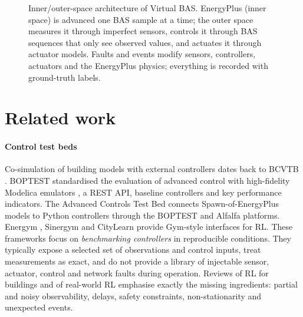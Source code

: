 \documentclass[preprint,12pt,authoryear=false]{elsarticle}
\begin{document}
\begin{figure}[t]
{}
\caption{Inner/outer-space architecture of Virtual BAS. EnergyPlus (inner space) is advanced one BAS sample at a time;
the outer space measures it through imperfect sensors, controls it through BAS sequences that only see observed
values, and actuates it through actuator models. Faults and events modify sensors, controllers, actuators and the
EnergyPlus physics; everything is recorded with ground-truth labels.}
\label{fig:architecture}
\end{figure}

\section{Related work}
\label{sec:related}

\paragraph{Control test beds} Co-simulation of building models with external controllers dates back to BCVTB
\cite{wetter2011bcvtb}. BOPTEST \cite{blum2021boptest} standardised the evaluation of advanced control with
high-fidelity Modelica emulators \cite{wetter2014modelica}, a REST API, baseline controllers and key performance
indicators. The Advanced Controls Test Bed \cite{marzullo2022actb} connects Spawn-of-EnergyPlus models to Python
controllers through the BOPTEST and Alfalfa platforms. Energym \cite{scharnhorst2021energym}, Sinergym
\cite{jimenez2021sinergym} and CityLearn \cite{vazquez2019citylearn} provide Gym-style interfaces \cite{brockman2016gym}
for RL. These frameworks focus on \emph{benchmarking controllers} in reproducible conditions. They typically expose a
selected set of observations and control inputs, treat measurements as exact, and do not provide a library of
injectable sensor, actuator, control and network faults during operation. Reviews of RL for buildings
\cite{wang2020rlreview} and of real-world RL \cite{nweye2022realworld,dulacarnold2021challenges} emphasise exactly the
missing ingredients: partial and noisy observability, delays, safety constraints, non-stationarity and unexpected
events.
\end{document}
